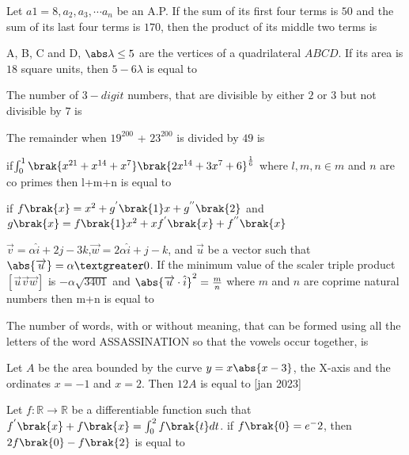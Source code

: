 \iffalse
\title{Assignment 3}
\author{AI24BTECH11018}
\section{integer}
\fi
\item Let $a1 = 8, a_2, a_3,\cdots  a_n$ be an A.P. If the sum of its 
first four terms is $50$ and the sum of its last four 
terms is $170$, then the product of its middle two 
terms is
\hfill{}
\item A, B, C and D, 
$\abs \lambda \leq 5$ are the vertices of a quadrilateral $ABCD$. If 
its area is $18$ square units, then $5-6\lambda$ is equal to
\hfill{}
\item The number of 
$3-digit$ numbers, that are divisible 
by either $2$ or $3$ but not divisible by $7$ is
\hfill{}
\item The remainder when $19^{200}$ + $23^{200}$ is divided by $49$
is 
\hfill{}
\item if$\int_{0}^{1}\brak{x^{21}+x^{14}+x^7}\brak{2x^{14}+3x^{7}+6}^\frac{1}{6}$ where $l,m,n \in m$ and $n$ are co primes then l+m+n is equal to
\hfill{}
\item if $f\brak{x}=x^2+g^{'}\brak{1}x+g^{''}\brak{2}$ and $g\brak{x}=f\brak{1}x^2+xf^{'}\brak{x}+f^{''}\brak{x}$
\hfill{}
\item $\overrightarrow{v}=\alpha \hat{i}+2j-3k$,$\overrightarrow{w}=2\alpha \hat{i}+j-k$, and $\overrightarrow{u}$ be a vector such that $\abs {\overrightarrow{u}}=\alpha  \textgreater 0$. If the minimum value of the scaler triple product $[\overrightarrow{u} \overrightarrow{v} \overrightarrow{w}]$ is $-\alpha \sqrt{3401}$ and $\abs {\overrightarrow{u}\cdot \hat{i}}^2=\frac{m}{n}$ where $m$ and $n$ are coprime natural numbers then m+n is equal to
\hfill{}
\item The number of words, with or without meaning, 
that can be formed using all the letters of the word 
ASSASSINATION so that the vowels occur 
together, is
\hfill{}
\item Let $A$ be the area bounded by the curve $y=x\abs {x-3}$, the X-axis and the ordinates $x=-1$ and $x=2$. Then $12A$ is equal to 
\hfill{[jan 2023]}
\item Let $f:\mathbb{R} \to \mathbb{R}$ be a differentiable function such that $f^{'}\brak{x}+f\brak{x}=\int_{0}^{2}f\brak{t}dt$. if $f\brak{0}=e^-2$, then $2f\brak{0}-f\brak{2}$ is equal to
\hfill{}

%
